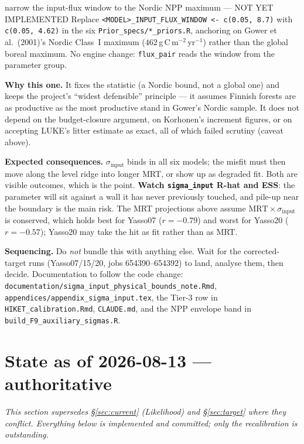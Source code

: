\documentclass[11pt]{article}
\newcommand{\sinput}{\sigma_{\mathrm{input}}}
\begin{document}
\begin{proposal}{narrow the input-flux window to the Nordic NPP maximum --- NOT YET IMPLEMENTED}
Replace \verb|<MODEL>_INPUT_FLUX_WINDOW <- c(0.05, 8.7)| with \verb|c(0.05, 4.62)| in the six
\texttt{Prior\_specs/*\_priors.R}, anchoring on Gower et al.\ (2001)'s Nordic Class~I maximum
($462$\,g\,C\,m$^{-2}$\,yr$^{-1}$) rather than the global boreal maximum. No engine change:
\texttt{flux\_pair} reads the window from the parameter group.

\textbf{Why this one.} It fixes the statistic (a Nordic bound, not a global one) and keeps the
project's ``widest defensible'' principle --- it assumes Finnish forests are as productive as the
most productive stand in Gower's Nordic sample. It does not depend on the budget-closure
argument, on Korhonen's increment figures, or on accepting LUKE's litter estimate as exact, all
of which failed scrutiny (caveat above).

\textbf{Expected consequences.} $\sinput$ binds in all six models; the misfit must then move
along the level ridge into longer MRT, or show up as degraded fit. Both are visible outcomes,
which is the point. \textbf{Watch \texttt{sigma\_input} R-hat and ESS}: the parameter will sit
against a wall it has never previously touched, and pile-up near the boundary is the main risk.
The MRT projections above assume $\text{MRT}\times\sinput$ is conserved, which holds best for
Yasso07 ($r=-0.79$) and worst for Yasso20 ($r=-0.57$); Yasso20 may take the hit as fit rather
than as MRT.

\textbf{Sequencing.} Do \emph{not} bundle this with anything else. Wait for the corrected-target
runs (Yasso07/15/20, jobs 654390--654392) to land, analyse them, then decide. Documentation to
follow the code change: \texttt{documentation/sigma\_input\_physical\_bounds\_note.Rmd},
\texttt{appendices/appendix\_sigma\_input.tex}, the Tier-3 row in \texttt{HIKET\_calibration.Rmd},
\texttt{CLAUDE.md}, and the NPP envelope band in \texttt{build\_F9\_auxiliary\_sigmas.R}.
\end{proposal}

\section{State as of 2026-08-13 --- authoritative}\label{sec:state0813}

\emph{This section supersedes \S\ref{sec:current} (Likelihood) and \S\ref{sec:target} where they
conflict. Everything below is implemented and committed; only the recalibration is outstanding.}
\end{document}
